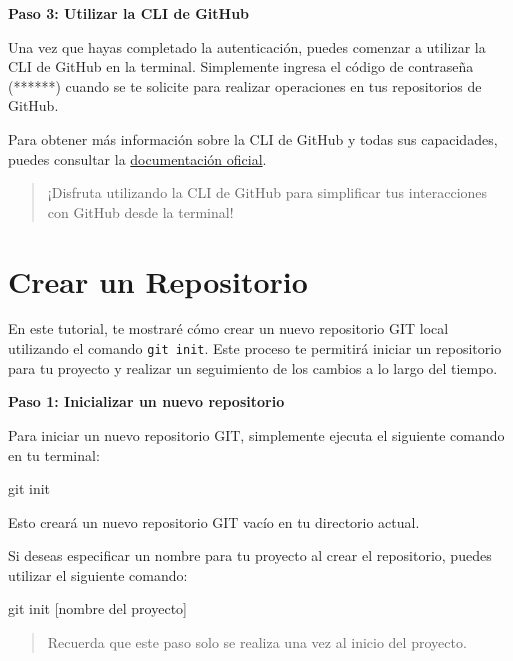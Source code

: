 \documentclass[
  a4paper,
]{article}
\newenvironment{Shaded}{}{}
\newcommand{\FunctionTok}[1]{\textcolor[rgb]{0.44,0.26,0.76}{#1}}
\newcommand{\NormalTok}[1]{\textcolor[rgb]{0.14,0.16,0.18}{#1}}
\begin{document}
\textbf{Paso 3: Utilizar la CLI de GitHub}

Una vez que hayas completado la autenticación, puedes comenzar a
utilizar la CLI de GitHub en la terminal. Simplemente ingresa el código
de contraseña (******) cuando se te solicite para realizar operaciones
en tus repositorios de GitHub.

Para obtener más información sobre la CLI de GitHub y todas sus
capacidades, puedes consultar la
\href{https://cli.github.com/}{documentación oficial}.

\begin{quote}
¡Disfruta utilizando la CLI de GitHub para simplificar tus interacciones
con GitHub desde la terminal!
\end{quote}

\section{Crear un Repositorio}\label{crear-un-repositorio}

En este tutorial, te mostraré cómo crear un nuevo repositorio GIT local
utilizando el comando \texttt{git\ init}. Este proceso te permitirá
iniciar un repositorio para tu proyecto y realizar un seguimiento de los
cambios a lo largo del tiempo.

\textbf{Paso 1: Inicializar un nuevo repositorio}

Para iniciar un nuevo repositorio GIT, simplemente ejecuta el siguiente
comando en tu terminal:

\begin{Shaded}
\begin{Highlighting}[]
\FunctionTok{git}\NormalTok{ init}
\end{Highlighting}
\end{Shaded}

Esto creará un nuevo repositorio GIT vacío en tu directorio actual.

Si deseas especificar un nombre para tu proyecto al crear el
repositorio, puedes utilizar el siguiente comando:

\begin{Shaded}
\begin{Highlighting}[]
\FunctionTok{git}\NormalTok{ init [nombre del proyecto]}
\end{Highlighting}
\end{Shaded}

\begin{quote}
Recuerda que este paso solo se realiza una vez al inicio del proyecto.
\end{quote}
\end{document}

